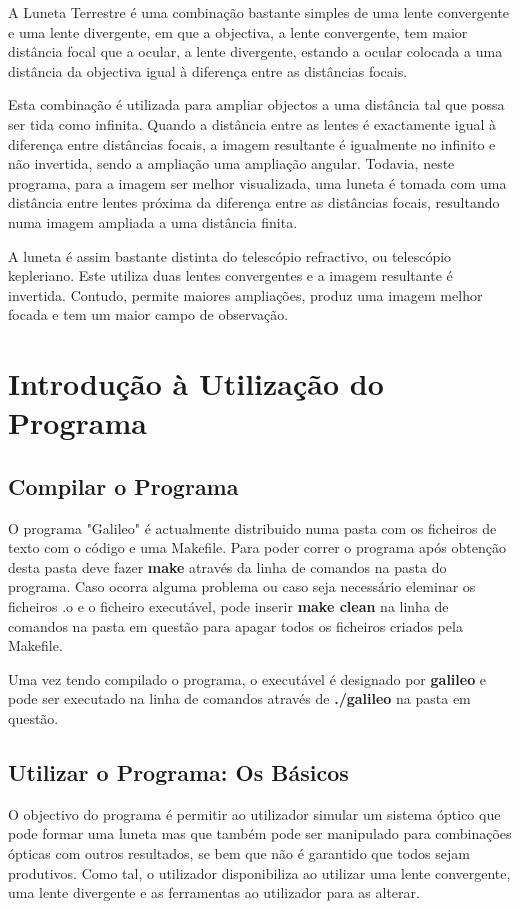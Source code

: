 \documentclass[a4paper,12pt]{article}
\begin{document}
A Luneta Terrestre é uma combinação bastante simples de uma lente convergente e uma lente divergente, em que a objectiva, a lente convergente, tem maior distância focal que a ocular, a lente divergente, estando a ocular colocada a uma distância da objectiva igual à diferença entre as distâncias focais.
\par
Esta combinação é utilizada para ampliar objectos a uma distância tal que possa ser tida como infinita. Quando a distância entre as lentes é exactamente igual à diferença entre distâncias focais, a imagem resultante é igualmente no infinito e não invertida, sendo a ampliação uma ampliação angular. Todavia, neste programa, para a imagem ser melhor visualizada, uma luneta é tomada com uma distância entre lentes próxima da diferença entre as distâncias focais, resultando numa imagem ampliada a uma distância finita.
\par
A luneta é assim bastante distinta do telescópio refractivo, ou telescópio kepleriano. Este utiliza duas lentes convergentes e a imagem resultante é invertida. Contudo, permite maiores ampliações, produz uma imagem melhor focada e tem um maior campo de observação.
 
\pagebreak
 
\section{Introdução à Utilização do Programa}

\subsection{Compilar o Programa}
O programa "Galileo" é actualmente distribuido numa pasta com os ficheiros de texto com o código e uma Makefile. Para poder correr o programa após obtenção desta pasta deve fazer {\bf make} através da linha de comandos na pasta do programa. Caso ocorra alguma problema ou caso seja necessário eleminar os ficheiros .o e o ficheiro executável, pode inserir {\bf make clean} na linha de comandos na pasta em questão para apagar todos os ficheiros criados pela Makefile.
\par
Uma vez tendo compilado o programa, o executável é designado por {\bf galileo} e pode ser executado na linha de comandos através de {\bf ./galileo} na pasta em questão.

\subsection{Utilizar o Programa: Os Básicos}
O objectivo do programa é permitir ao utilizador simular um sistema óptico que pode formar uma luneta mas que também pode ser manipulado para combinações ópticas com outros resultados, se bem que não é garantido que todos sejam produtivos. Como tal, o utilizador disponibiliza ao utilizar uma lente convergente, uma lente divergente e as ferramentas ao utilizador para as alterar.
\end{document}

